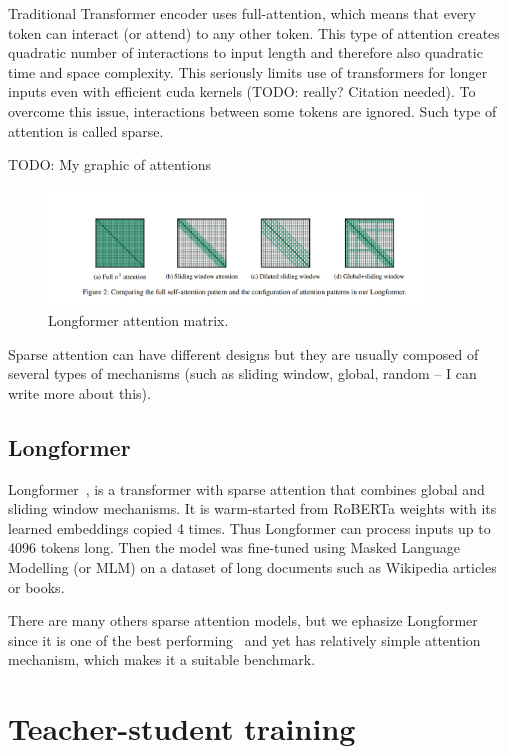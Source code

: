 Traditional Transformer encoder uses full-attention, which means that every
token can interact (or attend) to any other token. This type of attention
creates quadratic number of interactions to input length and therefore also
quadratic time and space complexity. This seriously limits use of transformers
for longer inputs even with efficient cuda kernels (TODO: really? Citation
needed). To overcome this issue, interactions between some tokens are ignored.
Such type of attention is called sparse.

TODO: My graphic of attentions

\begin{figure}[h]
    \centering
    \includegraphics[width=0.9\textwidth]{./img/longformer_attention.png}
    \caption{Longformer attention matrix.\label{fig:longformer_sparse_att}}
\end{figure}

Sparse attention can have different designs but they are usually composed of
several types of mechanisms (such as sliding window, global, random -- I can
write more about this).

\subsection{Longformer}

Longformer~\cite{beltagy2020longformer}, is a transformer with sparse attention
that combines global and sliding window mechanisms. It is warm-started from
RoBERTa weights with its learned embeddings copied 4 times. Thus Longformer can
process inputs up to 4096 tokens long. Then the model was fine-tuned using
Masked Language Modelling (or MLM) on a dataset of long documents such as
Wikipedia articles or books.

There are many others sparse attention models, but we ephasize Longformer since
it is one of the best performing~\cite{tay2020long} and yet has relatively
simple attention mechanism, which makes it a suitable benchmark.

\section{Teacher-student training}

